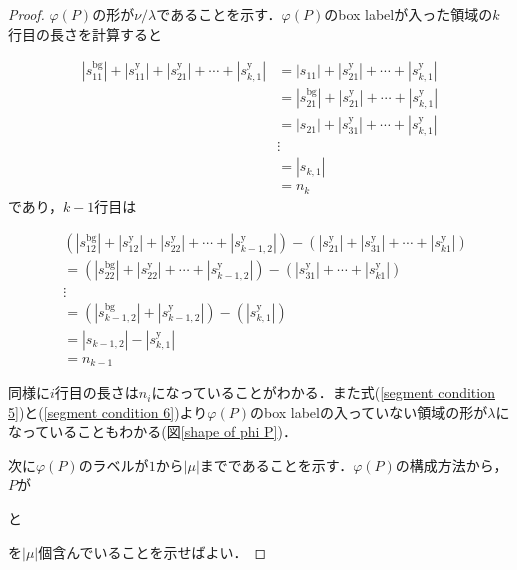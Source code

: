\begin{proof}
  $\varphi(P)$の形が$\nu/\lambda$であることを示す．$\varphi(P)$のbox labelが入った領域の$k$行目の長さを計算すると

  \begin{align*}
    |s_{11}^{\text{bg}}| + |s_{11}^{\text{y}}| + |s_{21}^{\text{y}}| + \cdots + |s_{k,1}^{\text{y}}|
    &=|s_{11}| + |s_{21}^{\text{y}}| + \cdots + |s_{k,1}^{\text{y}}|\\
    &=|s_{21}^{\text{bg}}| + |s_{21}^{\text{y}}| + \cdots + |s_{k,1}^{\text{y}}|\\
    &=|s_{21}| + |s_{31}^{\text{y}}| + \cdots + |s_{k,1}^{\text{y}}|\\
    &\vdots\\
    &=|s_{k,1}|\\
    &=n_k
  \end{align*}
  であり，$k-1$行目は

  \begin{align*}
    &(|s_{12}^{\text{bg}}| + |s_{12}^{\text{y}}| + |s_{22}^{\text{y}}| + \cdots + |s_{k-1,2}^{\text{y}}|)
    - (|s_{21}^{\text{y}}|+|s_{31}^{\text{y}}|+\cdots+|s_{k1}^{\text{y}}|)\\
    &=(|s_{22}^{\text{bg}}| + |s_{22}^{\text{y}}| + \cdots + |s_{k-1,2}^{\text{y}}|) - (|s_{31}^{\text{y}}|+\cdots+|s_{k1}^{\text{y}}|)\\
    &\vdots\\
    &=(|s_{k-1,2}^{\text{bg}}|+|s_{k-1,2}^{\text{y}}|)-(|s_{k,1}^{\text{y}}|)\\
    &=|s_{k-1,2}| - |s_{k,1}^{\text{y}}|\\
    &=n_{k-1}
  \end{align*}

  同様に$i$行目の長さは$n_{i}$になっていることがわかる．また式(\ref{segment condition 5})と(\ref{segment condition 6})より$\varphi(P)$のbox labelの入っていない領域の形が$\lambda$になっていることもわかる(図\ref{shape of phi P})．
  

  次に$\varphi(P)$のラベルが$1$から$|\mu|$までであることを示す．$\varphi(P)$の構成方法から，$P$が
  と
  を$|\mu|$個含んでいることを示せばよい．


\end{proof}
